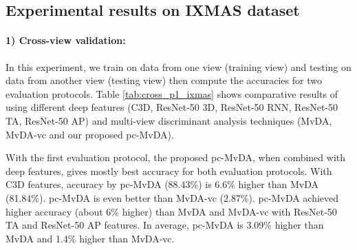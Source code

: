 
\subsection{Experimental results on IXMAS dataset}
    \paragraph{1) Cross-view validation:} In this experiment, we train on data from one view (training view) and testing on data from another view (testing view) then compute the accuracies for two evaluation protocols. Table \ref{tab:cross_p1_ixmas} shows comparative results of using different deep features (C3D, ResNet-50 3D, ResNet-50 RNN, ResNet-50 TA, ResNet-50 AP) and multi-view discriminant analysis techniques (MvDA, MvDA-vc and our proposed pc-MvDA). 

    With the first evaluation protocol, the proposed pc-MvDA, when combined with deep features, gives mostly best accuracy for both evaluation protocols. With C3D features, accuracy by pc-MvDA (88.43\%) is 6.6\% higher than MvDA (81.84\%). pc-MvDA is even better than MvDA-vc (2.87\%). pc-MvDA achieved higher accuracy (about 6\% higher) than MvDA and MvDA-vc with ResNet-50 TA and ResNet-50 AP features. In average, pc-MvDA is 3.09\% higher than MvDA and 1.4\% higher than MvDA-vc.
    
    \begin{table}[htbp]
    \centering
    \caption{Cross-view recognition comparison on IXMAS dataset.}
    \label{tab:cross_p1_ixmas}
    \end{table}

